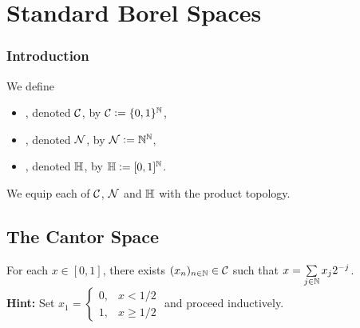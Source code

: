 \documentclass{book}
\begin{document}
	
	
	
	
	
	
	
	
	
	
	
	
	
	
	
	
	
	
	
	
	
	
	
	
	
	
	
	
	
	
	
	
	
	
	
	\newpage
	\section{Standard Borel Spaces}
	
	\subsubsection{Introduction} 
	
	\begin{defn}
		We define 
		\begin{itemize}
			\item {}, denoted $\mathcal{C}$, by $\mathcal{C} \vcentcolon= \{0,1\}^{\mathbb{N}}$,
			\item {}, denoted $\mathcal{N}$, by $\mathcal{N} \vcentcolon= \mathbb{N}^{\mathbb{N}}$,
			\item {}, denoted $\mathbb{H}$, by $\mathbb{H} \vcentcolon= [0,1]^{\mathbb{N}}$.
		\end{itemize}
		We equip each of $\mathcal{C}$, $\mathcal{N}$ and $\mathbb{H}$ with the product topology.
	\end{defn}









	\subsection{The Cantor Space}
	
	\begin{ex}  
		For each $x \in [0, 1]$, there exists $(x_n)_{n \in \mathbb{N}} \in \mathcal{C}$ such that $x = \sum\limits_{j \in \mathbb{N}} x_j2^{-j}$. \\
		\textbf{Hint:} Set $x_1 = 
		\begin{cases}
			0, & x < 1/2 \\
			1, & x \geq 1/2 
		\end{cases}$
		and proceed inductively. 
	\end{ex}
	
\end{document}
